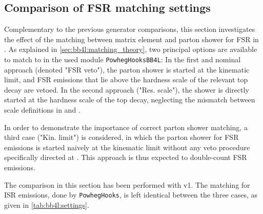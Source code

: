 \subsection{Comparison of FSR matching settings}
\label{sec:bb4l:matching}

Complementary to the previous generator comparisons, this section investigates the effect of the matching between matrix element and parton shower for FSR in \bbfourl. As explained in \cref{sec:bb4l:matching_theory}, two principal options are available to match \bbfourl to \pythia in the used module \texttt{PowhegHooksBB4L}: In the first and nominal approach (denoted "FSR veto"), the parton shower is started at the kinematic limit, and FSR emissions that lie above the \powheg hardness scale of the relevant top decay are vetoed. In the second approach ("Res. scale"), the shower is directly started at the hardness scale of the top decay, neglecting the mismatch between scale definitions in \powheg and \pythia. 

In order to demonstrate the importance of correct parton shower matching, a third case ("Kin. limit") is considered, in which the parton shower for FSR emissions is started naively at the kinematic limit without any veto procedure specifically directed at \bbfourl. This approach is thus expected to double-count FSR emissions.

The comparison in this section has been performed with \bbfourl v1. The matching for ISR emissions, done by \texttt{PowhegHooks}, is left identical between the three cases, as given in \cref{tab:bb4l:settings}.


